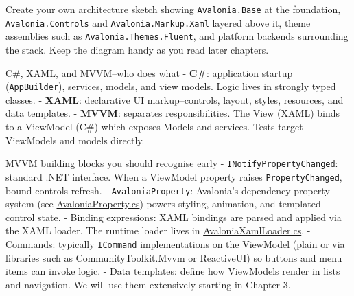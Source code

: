 Create your own architecture sketch showing
\passthrough{\lstinline!Avalonia.Base!} at the foundation,
\passthrough{\lstinline!Avalonia.Controls!} and
\passthrough{\lstinline!Avalonia.Markup.Xaml!} layered above it, theme
assemblies such as \passthrough{\lstinline!Avalonia.Themes.Fluent!}, and
platform backends surrounding the stack. Keep the diagram handy as you
read later chapters.

C\#, XAML, and MVVM--who does what - \textbf{C\#}: application startup
(\passthrough{\lstinline!AppBuilder!}), services, models, and view
models. Logic lives in strongly typed classes. - \textbf{XAML}:
declarative UI markup--controls, layout, styles, resources, and data
templates. - \textbf{MVVM}: separates responsibilities. The View (XAML)
binds to a ViewModel (C\#) which exposes Models and services. Tests
target ViewModels and models directly.

MVVM building blocks you should recognise early -
\passthrough{\lstinline!INotifyPropertyChanged!}: standard .NET
interface. When a ViewModel property raises
\passthrough{\lstinline!PropertyChanged!}, bound controls refresh. -
\passthrough{\lstinline!AvaloniaProperty!}: Avalonia's dependency
property system (see
\href{https://github.com/AvaloniaUI/Avalonia/blob/master/src/Avalonia.Base/AvaloniaProperty.cs}{AvaloniaProperty.cs})
powers styling, animation, and templated control state. - Binding
expressions: XAML bindings are parsed and applied via the XAML loader.
The runtime loader lives in
\href{https://github.com/AvaloniaUI/Avalonia/blob/master/src/Avalonia.Markup.Xaml/AvaloniaXamlLoader.cs}{AvaloniaXamlLoader.cs}.
- Commands: typically \passthrough{\lstinline!ICommand!} implementations
on the ViewModel (plain or via libraries such as CommunityToolkit.Mvvm
or ReactiveUI) so buttons and menu items can invoke logic. - Data
templates: define how ViewModels render in lists and navigation. We will
use them extensively starting in Chapter 3.

